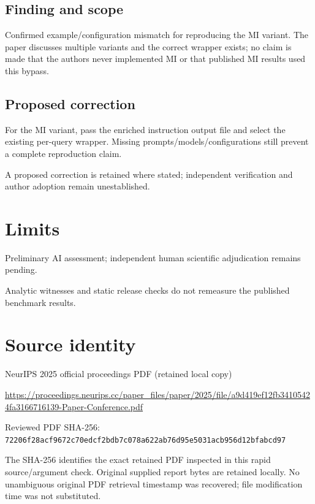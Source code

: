 \documentclass[11pt]{article}
\begin{document}
\subsection*{Finding and scope}

Confirmed example/configuration mismatch for reproducing the MI variant. The paper discusses multiple variants and the correct wrapper exists; no claim is made that the authors never implemented MI or that published MI results used this bypass.

\subsection*{Proposed correction}

For the MI variant, pass the enriched instruction output file and select the existing per-query wrapper. Missing prompts/models/configurations still prevent a complete reproduction claim.

A proposed correction is retained where stated; independent verification and author adoption remain unestablished.

\section*{Limits}

Preliminary AI assessment; independent human scientific adjudication remains pending.\par

Analytic witnesses and static release checks do not remeasure the published benchmark results.\par

\section*{Source identity}

NeurIPS 2025 official proceedings PDF (retained local copy)

\url{https://proceedings.neurips.cc/paper_files/paper/2025/file/a9d419ef12fb34105424fa3166716139-Paper-Conference.pdf}

Reviewed PDF SHA-256: \nolinkurl{72206f28acf9672c70edcf2bdb7c078a622ab76d95e5031acb956d12bfabcd97}

The SHA-256 identifies the exact retained PDF inspected in this rapid source/argument check. Original supplied report bytes are retained locally. No unambiguous original PDF retrieval timestamp was recovered; file modification time was not substituted.
\end{document}
